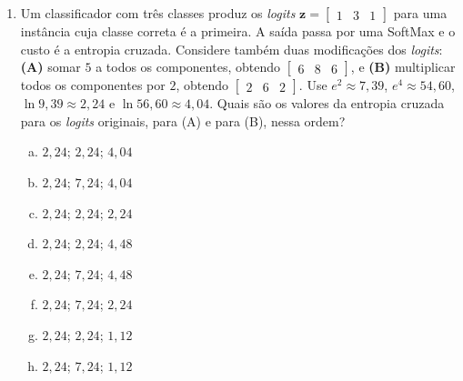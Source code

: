 \documentclass{dlproblemset}
\begin{document}
\begin{enumerate}[1)]
    Em uma iteração com $d = 4$ temos
    \[
    \mathbf{x} = (2;\ -1;\ 3;\ 0{,}5), \qquad
    \mathbf{u} = (1;\ 0;\ 1;\ 1), \qquad
    \mathbf{G} = \frac{\partial J}{\partial \mathbf{s}} = (4;\ 6;\ -2;\ 8).
    \]
    Qual é o gradiente $\partial J / \partial \mathbf{x}$ que o nodo de \textit{dropout} envia pela sua aresta de entrada?

    \begin{enumerate}[(a)]
        \item $(4;\ 6;\ -2;\ 8)$
        \item $(8;\ -6;\ -6;\ 4)$
        \item $(2;\ 0;\ 3;\ 0{,}5)$
        \item $(0;\ 6;\ 0;\ 0)$
        \item $(1;\ 0;\ 1;\ 1)$
        \item $(8;\ 0;\ -6;\ 4)$
        \item $(4;\ 0;\ -2;\ 8)$
        \item $(0;\ 0;\ 0;\ 0)$
    \end{enumerate}

    \item Um classificador com três classes produz os \textit{logits} $\mathbf{z} = \begin{bmatrix} 1 & 3 & 1 \end{bmatrix}$ para uma instância cuja classe correta é a primeira. A saída passa por uma SoftMax e o custo é a entropia cruzada. Considere também duas modificações dos \textit{logits}: \textbf{(A)} somar $5$ a todos os componentes, obtendo $\begin{bmatrix} 6 & 8 & 6 \end{bmatrix}$, e \textbf{(B)} multiplicar todos os componentes por $2$, obtendo $\begin{bmatrix} 2 & 6 & 2 \end{bmatrix}$. Use $e^{2} \approx 7{,}39$, $e^{4} \approx 54{,}60$, $\ln 9{,}39 \approx 2{,}24$ e $\ln 56{,}60 \approx 4{,}04$. Quais são os valores da entropia cruzada para os \textit{logits} originais, para (A) e para (B), nessa ordem?

    \begin{enumerate}[(a)]
        \item $2{,}24$; $2{,}24$; $4{,}04$
        \item $2{,}24$; $7{,}24$; $4{,}04$
        \item $2{,}24$; $2{,}24$; $2{,}24$
        \item $2{,}24$; $2{,}24$; $4{,}48$
        \item $2{,}24$; $7{,}24$; $4{,}48$
        \item $2{,}24$; $7{,}24$; $2{,}24$
        \item $2{,}24$; $2{,}24$; $1{,}12$
        \item $2{,}24$; $7{,}24$; $1{,}12$
    \end{enumerate}

\end{enumerate}
\end{document}
